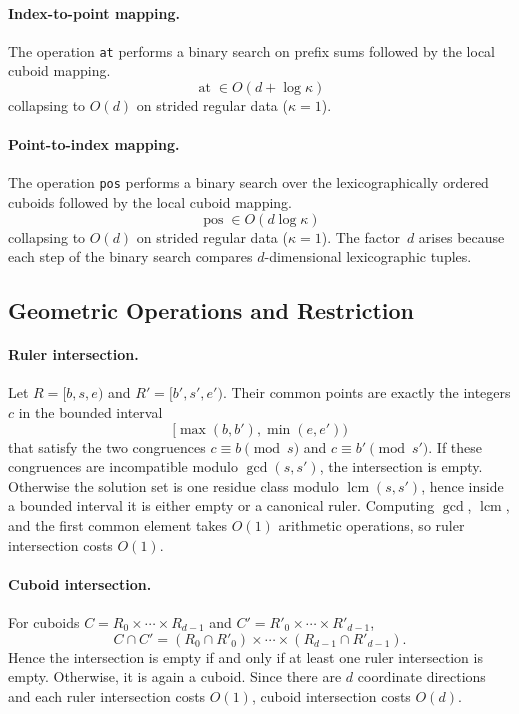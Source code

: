\documentclass[manuscript,screen,review]{acmart}
\theoremstyle{definition}
\theoremstyle{plain}
\begin{document}
\paragraph{Index-to-point mapping.}
The operation \texttt{at} performs a binary search on prefix sums followed by the local cuboid mapping.
\[
  \operatorname{at} \in O(d + \log \kappa)
\]
collapsing to $O(d)$ on strided regular data ($\kappa=1$).

\paragraph{Point-to-index mapping.}
The operation \texttt{pos} performs a binary search over the lexicographically ordered cuboids followed by the local cuboid mapping.
\[
  \operatorname{pos} \in O(d\log \kappa)
\]
collapsing to $O(d)$ on strided regular data ($\kappa=1$).
The factor~$d$ arises because each step of the binary search compares $d$-dimensional lexicographic tuples.

\subsection{Geometric Operations and Restriction}
\label{section:operations-restriction}

\paragraph{Ruler intersection.}
Let $R=[b,s,e)$ and $R'=[b',s',e')$. Their common points are exactly the integers $c$ in the bounded interval
\[
  [\max(b,b'), \min(e,e'))
\]
that satisfy the two congruences $c \equiv b \pmod s$ and $c \equiv b' \pmod {s'}$. If these congruences are incompatible modulo $\gcd(s,s')$, the intersection is empty. Otherwise the solution set is one residue class modulo $\operatorname{lcm}(s,s')$, hence inside a bounded interval it is either empty or a canonical ruler. Computing $\gcd$, $\operatorname{lcm}$, and the first common element takes $O(1)$ arithmetic operations, so ruler intersection costs $O(1)$.

\paragraph{Cuboid intersection.}
For cuboids $C = R_0 \times \cdots \times R_{d-1}$ and $C' = R'_0 \times \cdots \times R'_{d-1}$,
\[
  C \cap C' = (R_0 \cap R'_0) \times \cdots \times (R_{d-1} \cap R'_{d-1}).
\]
Hence the intersection is empty if and only if at least one ruler intersection is empty. Otherwise, it is again a cuboid. Since there are $d$ coordinate directions and each ruler intersection costs $O(1)$, cuboid intersection costs $O(d)$.
\end{document}

